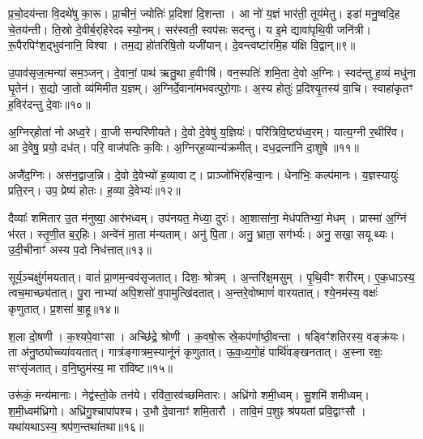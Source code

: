 प्र॒चो॒दय॑न्ता वि॒दथे॑षु का॒रू।
प्रा॒चीनं॒ ज्योतिः॑ प्र॒दिशा॑ दि॒शन्ता।
आ नो॑ य॒ज्ञं भार॑ती॒ तूय॑मेतु।
इडा॑ मनु॒ष्वदि॒ह चे॒तय॑न्ती।
ति॒स्रो दे॒वीर्ब॒र्‌\mbox{}हिरेदꣴ स्यो॒नम्।
सर॑स्वती॒ स्वप॑सः सदन्तु।
य इ॒मे द्यावा॑पृथि॒वी जनि॑त्री।
रू॒पैरपिꣳ॑श॒द्भुव॑नानि॒ विश्वा।
तम॒द्य हो॑तरिषि॒तो यजी॑यान्।
दे॒वन्त्वष्टा॑रमि॒ह य॑क्षि वि॒द्वान्॥९॥

उ॒पाव॑सृज॒त्मन्या॑ सम॒ञ्जन्।
दे॒वानां॒ पाथ॑ ऋतु॒था ह॒वीꣳषि॑।
वन॒स्पतिः॑ शमि॒ता दे॒वो अ॒ग्निः।
स्वद॑न्तु ह॒व्यं मधु॑ना घृ॒तेन॑।
स॒द्यो जा॒तो व्य॑मिमीत य॒ज्ञम्।
अ॒ग्निर्दे॒वाना॑मभवत्पुरो॒गाः।
अ॒स्य होतुः॑ प्र॒दिश्यृ॒तस्य॑ वा॒चि।
स्वाहा॑कृतꣳ ह॒विर॑दन्तु दे॒वाः॥१०॥\anuvakamend[य॒ज्ञैः स्यो॒नं यज॑ध्यै वि॒द्वान॒ष्टौ च॑]

अ॒ग्निर्‌\mbox{}होता॑ नो अध्व॒रे।
वा॒जी सन्परि॑णीयते।
दे॒वो दे॒वेषु॑ य॒ज्ञियः॑।
परि॑त्रिवि॒ष्ट्य॑ध्व॒रम्।
यात्य॒ग्नी र॒थीरि॑व।
आ दे॒वेषु॒ प्रयो॒ दध॑त्।
परि॒ वाज॑पतिः क॒विः।
अ॒ग्निर्‌\mbox{}ह॒व्यान्य॑क्रमीत्।
दध॒द्रत्ना॑नि दा॒शुषे॥११॥\anuvakamend[अ॒ग्निर्‌\mbox{}होता॑ नो॒ नव॑]

अजै॑द॒ग्निः।
अस॑न॒द्वाज॒न्नि।
दे॒वो दे॒वेभ्यो॑ ह॒व्यावाट्।
प्राञ्जो॑भिर्‌\mbox{}हिन्वा॒नः।
धेना॑भिः॒ कल्प॑मानः।
य॒ज्ञस्यायुः॑ प्रति॒रन्।
उप॒ प्रेष्य॑ होतः।
ह॒व्या दे॒वेभ्यः॑॥१२॥\anuvakamend[अजै॑द॒ष्टौ]

दैव्याः᳚ शमितार उ॒त म॑नुष्या॒ आर॑भध्वम्।
उप॑नयत॒ मेध्या॒ दुरः॑।
आ॒शासा॑ना॒ मेध॑पतिभ्यां॒ मेधम्।
प्रास्मा॑ अ॒ग्निं भ॑रत।
स्तृ॒णी॒त ब॒र्॒हिः।
अन्वे॑नं मा॒ता म॑न्यताम्।
अनु॑ पि॒ता।
अनु॒ भ्राता॒ सग॑र्भ्यः।
अनु॒ सखा॒ सयूथ्यः।
उ॒दी॒चीनाꣳ॑ अस्य प॒दो निध॑त्तात्॥१३॥

सूर्य॒ञ्चक्षु॑र्गमयतात्।
वातं॑ प्रा॒णम॒न्वव॑सृजतात्।
दिशः॒ श्रोत्रम्।
अ॒न्तरि॑क्ष॒मसुम्।
पृ॒थि॒वीꣳ शरी॑रम्।
ए॒क॒धा\-ऽस्य॒ त्वच॒माच्छ्य॑तात्।
पु॒रा नाभ्या॑ अपि॒शसो॑ व॒पामुत्खि॑दतात्।
अ॒न्तरे॒वोष्माणं॑ वारयतात्।
श्ये॒नम॑स्य॒ वक्षः॑ कृणुतात्।
प्र॒शसा॑ बा॒हू॥१४॥

श॒ला दो॒षणी।
क॒श्यपे॒वाꣳसा।
अच्छि॑द्रे॒ श्रोणी।
क॒वषो॒रू स्रे॒कप॑र्णाष्ठी॒वन्ता।
षड्विꣳ॑शतिरस्य॒ वङ्क्र॑यः।
ता अ॑नु॒ष्ठ्योच्च्या॑वयतात्।
गात्र॑ङ्गात्रम॒स्यानू॑नं कृणुतात्।
ऊ॒व॒ध्य॒गो॒हं पार्थि॑वङ्खनतात्।
अ॒स्ना रक्षः॒ सꣳसृ॑जतात्।
व॒नि॒ष्ठुम॑स्य॒ मा रा॑विष्ट॥१५॥

उरू॑कं॒ मन्य॑मानाः।
नेद्व॑स्तो॒के तन॑ये।
रवि॑ता॒रव॑च्छमितारः।
अध्रि॑गो शमी॒ध्वम्।
सु॒शमि॑ शमीध्वम्।
श॒मी॒ध्वम॑ध्रिगो।
अध्रि॑गु॒श्चापा॑पश्च।
उ॒भौ दे॒वानाꣳ॑ शमि॒तारौ।
तावि॒मं प॒शुꣴ श्र॑पयतां प्रवि॒द्वाꣳसौ।
यथा॑यथा\-ऽस्य॒ श्रप॑ण॒न्तथा॑तथा॥१६॥\anuvakamend[ध॒त्ता॒द्बा॒हू मा रा॑विष्ट॒ तथा॑तथा]


